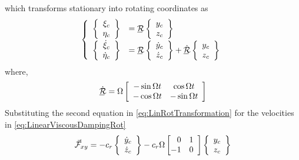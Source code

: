 which transforms stationary into rotating coordinates as
\begin{equation}\label{eq:LinRotTransformation}
\left\{\begin{array}{rl}
\left\{\begin{array}{c}
\xi_c\\
\eta_c
\end{array}\right\}&=\bunderline{\mathcal{R}}\left\{\begin{array}{c}
y_c\\
z_c
\end{array}\right\}\\
&\\[-1em]
\left\{\begin{array}{c}
\dot{\xi}_c\\
\dot{\eta}_c
\end{array}\right\}&=\bunderline{\mathcal{R}}\left\{\begin{array}{c}
\dot{y}_c\\
\dot{z}_c
\end{array}\right\}+\dot{\bunderline{\mathcal{R}}}\left\{\begin{array}{c}
y_c\\
z_c
\end{array}\right\}
\end{array}\right.
\end{equation}
where, \begin{equation}
\dot{\bunderline{\mathcal{R}}}=\Omega\left[\begin{array}{cc}
-\sin{\Omega t}& \cos{\Omega t}\\
-\cos{\Omega t}& -\sin{\Omega t}
\end{array}\right]
\end{equation}
Substituting the second equation in \ref{eq:LinRotTransformation} for the velocities in \ref{eq:LinearViscousDampingRot}
\begin{equation}\label{eq:LinearViscousDampingTrans}
\vec{\mathcal{F}}_{xy}=-c_r\left\{\begin{array}{c}
\dot{y}_c\\
\dot{z}_c
\end{array}\right\}-c_r\Omega\left[\begin{array}{@{}rc}
0&1\\
-1&0
\end{array}\right]\left\{\begin{array}{c}
y_c\\
z_c
\end{array}\right\}
\end{equation} 
